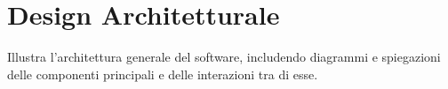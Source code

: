 \chapter{Design Architetturale} \label{chap:Design}
Illustra l'architettura generale del software, includendo diagrammi e spiegazioni delle componenti principali e delle interazioni tra di esse.